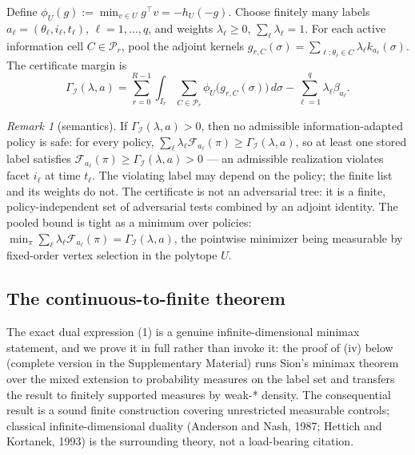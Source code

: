 \documentclass[10pt,twocolumn]{article}
\theoremstyle{plain}
\theoremstyle{definition}
\theoremstyle{remark}
\newtheorem{remark}[theorem]{Remark}
\begin{document}
Define \(\phi_U(g) := \min_{v \in U} g^\top v = -h_U(-g)\). Choose finitely
many labels \(a_\ell = (\theta_\ell, i_\ell, t_\ell)\), \(\ell = 1,\dots,q\),
and weights \(\lambda_\ell \ge 0\), \(\sum_\ell \lambda_\ell = 1\). For each
active information cell \(C \in \mathcal{P}_r\), pool the adjoint kernels
\(g_{r,C}(\sigma) = \sum_{\ell : \theta_\ell \in C} \lambda_\ell
k_{a_\ell}(\sigma)\). The certificate margin is
\[
\Gamma_{\mathcal{I}}(\lambda, a)
= \sum_{r=0}^{R-1} \int_{I_r} \sum_{C \in \mathcal{P}_r}
\phi_U\!\bigl(g_{r,C}(\sigma)\bigr)\, d\sigma
- \sum_{\ell=1}^q \lambda_\ell \beta_{a_\ell}.
\tag{1}
\]

\begin{remark}[semantics]\label{rem:semantics}
If \(\Gamma_{\mathcal{I}}(\lambda, a) > 0\), then no admissible
information-adapted policy is safe: for every policy,
\(\sum_\ell \lambda_\ell \mathcal{F}_{a_\ell}(\pi) \ge
\Gamma_{\mathcal{I}}(\lambda, a)\), so at least one stored label satisfies
\(\mathcal{F}_{a_\ell}(\pi) \ge \Gamma_{\mathcal{I}}(\lambda, a) > 0\) ---
an admissible realization violates facet \(i_\ell\) at time \(t_\ell\). The
violating label may depend on the policy; the finite list and its weights do
not. The certificate is not an adversarial tree: it is a finite,
policy-independent set of adversarial tests combined by an adjoint identity.
The pooled bound is tight as a minimum over policies:
\(\min_{\pi} \sum_\ell \lambda_\ell \mathcal{F}_{a_\ell}(\pi) =
\Gamma_{\mathcal{I}}(\lambda, a)\), the pointwise minimizer being
measurable by fixed-order vertex selection in the polytope \(U\).
\end{remark}

\subsection{The continuous-to-finite theorem}\label{bridge}

The exact dual expression (1) is a genuine infinite-dimensional minimax
statement, and we prove it in full rather than invoke it: the proof of
(iv) below (complete version in the Supplementary Material) runs Sion's
minimax theorem over the mixed extension to probability measures on the
label set and transfers the result to finitely supported measures by
weak-* density. The consequential result is a sound finite construction
covering unrestricted measurable controls; classical infinite-dimensional
duality (Anderson and Nash, 1987; Hettich and Kortanek, 1993) is the
surrounding theory, not a load-bearing citation.
\end{document}
